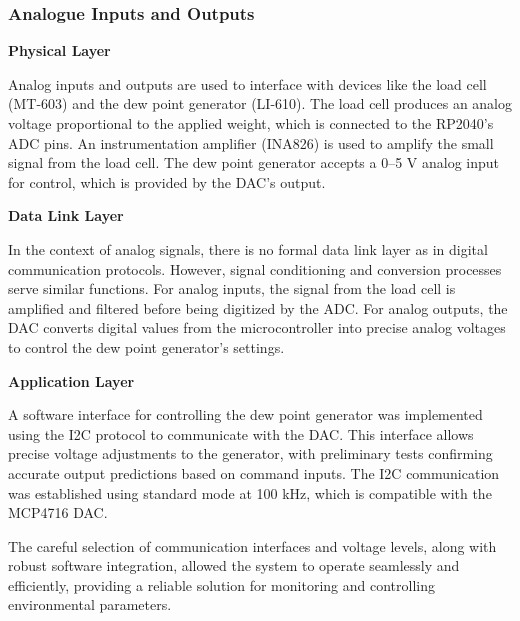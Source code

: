 \subsubsection{Analogue Inputs and Outputs}

\textbf{Physical Layer}

Analog inputs and outputs are used to interface with devices like the load cell (MT-603) and the dew point 
generator (LI-610). The load cell produces an analog voltage proportional to the applied weight, which is 
connected to the RP2040's ADC pins. An instrumentation amplifier (INA826) is used to amplify the small 
signal from the load cell. The dew point generator accepts a 0–5 V analog input for control, which is 
provided by the DAC's output.

\textbf{Data Link Layer}

In the context of analog signals, there is no formal data link layer as in digital communication protocols. 
However, signal conditioning and conversion processes serve similar functions. For analog inputs, the signal 
from the load cell is amplified and filtered before being digitized by the ADC. For analog outputs, the DAC 
converts digital values from the microcontroller into precise analog voltages to control the dew point 
generator's settings.

\textbf{Application Layer}

A software interface for controlling the dew point generator was implemented 
using the I2C protocol to communicate with the DAC. This interface allows precise voltage adjustments to 
the generator, with preliminary tests confirming accurate output predictions based on command inputs. 
The I2C communication was established using standard mode at 100 kHz, which is compatible with the MCP4716 DAC.

The careful selection of communication interfaces and voltage levels, along with robust software 
integration, allowed the system to operate seamlessly and efficiently, providing a reliable solution 
for monitoring and controlling environmental parameters.

